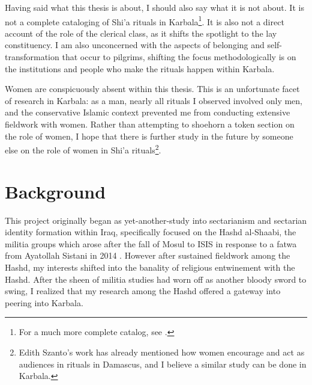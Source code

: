 Having said what this thesis is about, I should also say what it is not about. It is not a complete cataloging of Shi'a rituals in Karbala\footnote{For a much more complete catalog, see \cite{hamdan_development_2012}.}. It is also not a direct account of the role of the clerical class, as it shifts the spotlight to the lay constituency. I am also unconcerned with the aspects of belonging and self-transformation that occur to pilgrims, shifting the focus methodologically is on the institutions and people who make the rituals happen within Karbala.

Women are conspicuously absent within this thesis. This is an unfortunate facet of research in Karbala: as a man, nearly all rituals I observed involved only men, and the conservative Islamic context prevented me from conducting extensive fieldwork with women. Rather than attempting to shoehorn a token section on the role of women, I hope that there is further study in the future by someone else on the role of women in Shi'a rituals\footnote{Edith Szanto's work\cite{szanto_beyond_2013} has already mentioned how women encourage and act as audiences in rituals in Damascus, and I believe a similar study can be done in Karbala.}. 





\section{Background}
This project originally began as yet-another-study into sectarianism and sectarian identity formation within Iraq, specifically focused on the Hashd al-Shaabi, the militia groups which arose after the fall of Mosul to ISIS in response to a fatwa from Ayatollah Sistani in 2014 \cite{jonathan_stevenson_shia_2017}. However after sustained fieldwork among the Hashd, my interests shifted into the banality of religious entwinement with the Hashd. After the sheen of militia studies had worn off as another bloody sword to swing, I realized that my research among the Hashd offered a gateway into peering into Karbala. 

